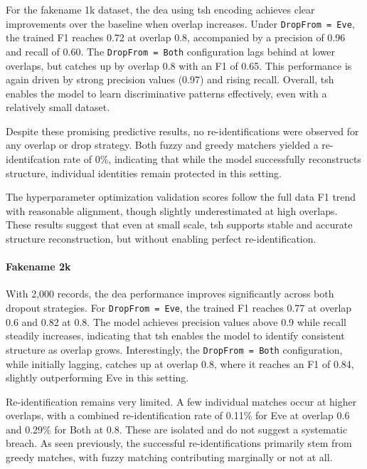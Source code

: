 For the fakename 1k dataset, the \ac{dea} using \ac{tsh} encoding achieves clear improvements over the baseline when overlap increases.
Under \texttt{DropFrom = Eve}, the trained F1 reaches 0.72 at overlap 0.8, accompanied by a precision of 0.96 and recall of 0.60.
The \texttt{DropFrom = Both} configuration lags behind at lower overlaps, but catches up by overlap 0.8 with an F1 of 0.65.
This performance is again driven by strong precision values (0.97) and rising recall.
Overall, \ac{tsh} enables the model to learn discriminative patterns effectively, even with a relatively small dataset.

Despite these promising predictive results, no re-identifications were observed for any overlap or drop strategy.
Both fuzzy and greedy matchers yielded a re-identifcation rate of 0\%, indicating that while the model successfully reconstructs structure, individual identities remain protected in this setting.

The hyperparameter optimization validation scores follow the full data F1 trend with reasonable alignment, though slightly underestimated at high overlaps.
These results suggest that even at small scale, \ac{tsh} supports stable and accurate structure reconstruction, but without enabling perfect re-identification.


\paragraph{Fakename 2k}

With 2{,}000 records, the \ac{dea} performance improves significantly across both dropout strategies.
For \texttt{DropFrom = Eve}, the trained F1 reaches 0.77 at overlap 0.6 and 0.82 at 0.8.
The model achieves precision values above 0.9 while recall steadily increases, indicating that \ac{tsh} enables the model to identify consistent structure as overlap grows.
Interestingly, the \texttt{DropFrom = Both} configuration, while initially lagging, catches up at overlap 0.8, where it reaches an F1 of 0.84, slightly outperforming Eve in this setting.

Re-identification remains very limited.
A few individual matches occur at higher overlaps, with a combined re-identification rate of 0.11\% for Eve at overlap 0.6 and 0.29\% for Both at 0.8.
These are isolated and do not suggest a systematic breach.
As seen previously, the successful re-identifications primarily stem from greedy matches, with fuzzy matching contributing marginally or not at all.


